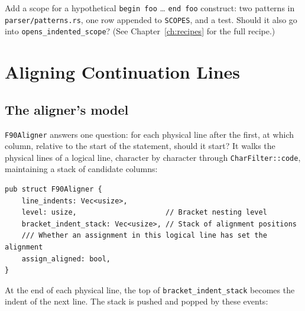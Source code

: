 \documentclass[11pt,a4paper,openany]{book}
\newcommand{\code}[1]{\texttt{\small #1}}
\newcommand{\file}[1]{\texttt{\small\color{accent}#1}}
\newcounter{exercise}[chapter]
\begin{document}
\begin{exercise}
Add a scope for a hypothetical \code{begin foo} \ldots{} \code{end foo} construct:
two patterns in \file{parser/patterns.rs}, one row appended to \code{SCOPES},
and a test. Should it also go into \code{opens\_indented\_scope}? (See
Chapter~\ref{ch:recipes} for the full recipe.)
\end{exercise}

\chapter{Aligning Continuation Lines}\label{ch:aligner}

\section{The aligner's model}

\code{F90Aligner} answers one question: for each physical line after the first,
at which column, relative to the start of the statement, should it start? It
walks the physical lines of a logical line, character by character through
\code{CharFilter::code}, maintaining a stack of candidate columns:

\begin{lstlisting}[style=rust]
pub struct F90Aligner {
    line_indents: Vec<usize>,
    level: usize,                     // Bracket nesting level
    bracket_indent_stack: Vec<usize>, // Stack of alignment positions
    /// Whether an assignment in this logical line has set the alignment
    assign_aligned: bool,
}
\end{lstlisting}

At the end of each physical line, the top of \code{bracket\_indent\_stack}
becomes the indent of the next line. The stack is pushed and popped by these
events:
\end{document}
